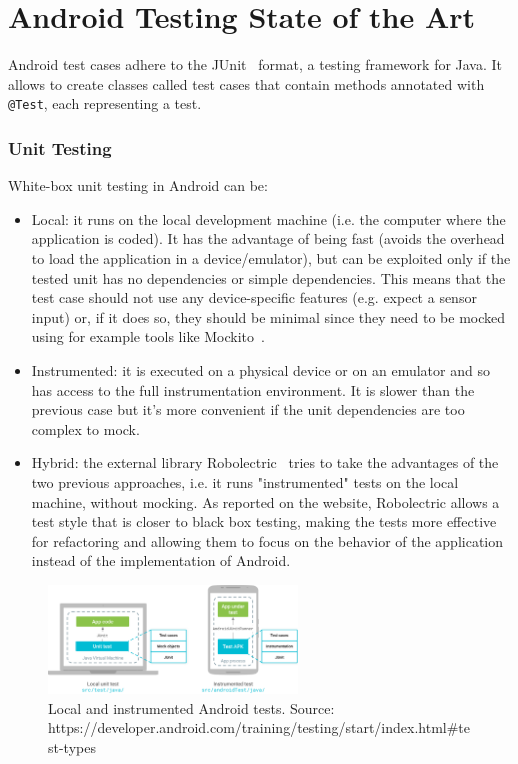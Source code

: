 \documentclass[11pt,a4paper,notitlepage]{article}
\begin{document}


\newpage
\part{Android Testing State of the Art}\label{part_state_art}

Android test cases adhere to the JUnit~\cite{JUnit} format, a testing framework for Java. It allows to create classes called test cases that contain methods annotated with \texttt{@Test}, each representing a test.

\section{Unit Testing}
White-box unit testing in Android can be:
\begin{itemize}
	\item Local: it runs on the local development machine (i.e. the computer where the application is coded). It has the advantage of being fast (avoids the overhead to load the application in a device/emulator), but can be exploited only if the tested unit has no dependencies or simple dependencies. This means that the test case should not use any device-specific features (e.g. expect a sensor input) or, if it does so, they should be minimal since they need to be mocked using for example tools like Mockito~\cite{Mockito}.
	\item Instrumented: it is executed on a physical device or on an emulator and so has access to the full instrumentation environment. It is slower than the previous case but it's more convenient if the unit dependencies are too complex to mock.
	\item Hybrid: the external library Robolectric~\cite{Robolectric} tries to take the advantages of the two previous approaches, i.e. it runs "instrumented" tests on the local machine, without mocking. As reported on the website, Robolectric allows a test style that is closer to black box testing, making the tests more effective for refactoring and allowing them to focus on the behavior of the application instead of the implementation of Android.
\end{itemize}
\begin{figure}
  \centering
  \includegraphics[width=250px]{Images/Android/test-types.png}
  \caption[Local and instrumented Android tests]{Local and instrumented Android tests. Source: https://developer.android.com/training/testing/start/index.html\#test-types}
\end{figure}
\end{document}

